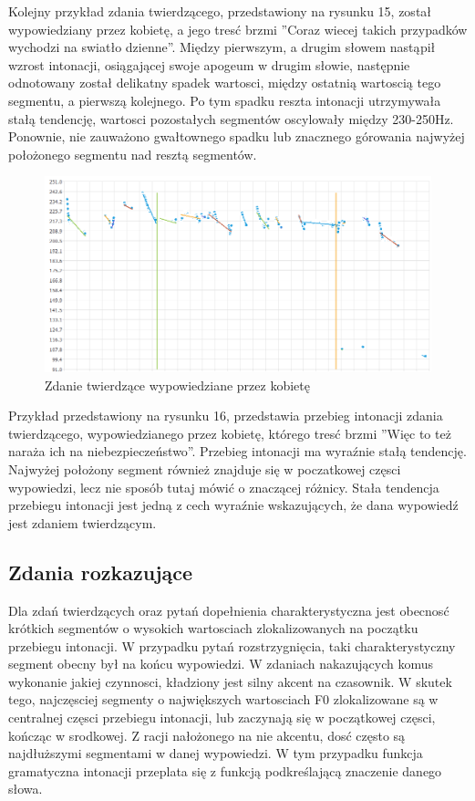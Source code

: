 \documentclass[a4paper,12 pt]{article}
\begin{document}
\FloatBarrier
Kolejny przykład zdania twierdzącego, przedstawiony na rysunku 15, został wypowiedziany przez kobietę, a jego tresć brzmi ''Coraz wiecej takich przypadków wychodzi na swiatło dzienne''. Między pierwszym, a drugim słowem nastąpił wzrost intonacji, osiągającej swoje apogeum w drugim słowie, następnie odnotowany został delikatny spadek wartosci, między ostatnią wartoscią tego segmentu, a pierwszą kolejnego. Po tym spadku reszta intonacji utrzymywała stałą tendencję, wartosci pozostałych segmentów oscylowały między 230-250Hz. Ponownie, nie zauważono gwałtownego spadku lub znacznego górowania najwyżej położonego segmentu nad resztą segmentów.
 \FloatBarrier
\begin{figure}[h]
\centering
\includegraphics[scale=0.7]{twierdzace_narazac.png}
\caption{Zdanie twierdzące wypowiedziane przez kobietę}
\end{figure}
\FloatBarrier
Przykład przedstawiony na rysunku 16, przedstawia przebieg intonacji zdania twierdzącego, wypowiedzianego przez kobietę, którego tresć brzmi ''Więc to też naraża ich na niebezpieczeństwo''. Przebieg intonacji ma wyraźnie stałą tendencję. Najwyżej położony segment również znajduje się w poczatkowej częsci wypowiedzi, lecz nie sposób tutaj mówić o znaczącej różnicy. Stała tendencja przebiegu intonacji jest jedną z cech wyraźnie wskazujących, że dana wypowiedź jest zdaniem twierdzącym.
\subsection{Zdania rozkazujące}
Dla zdań twierdzących oraz pytań dopełnienia charakterystyczna jest obecnosć krótkich segmentów o wysokich wartosciach zlokalizowanych na początku przebiegu intonacji. W przypadku pytań rozstrzygnięcia, taki charakterystyczny segment obecny był na końcu wypowiedzi. W zdaniach nakazujących komus wykonanie jakiej czynnosci, kładziony jest silny akcent na czasownik. W skutek tego, najczęsciej segmenty o największych wartosciach F0 zlokalizowane są w centralnej częsci przebiegu intonacji, lub zaczynają się w początkowej częsci, kończąc w srodkowej. Z racji nałożonego na nie akcentu, dosć często są najdłuższymi segmentami w danej wypowiedzi. W tym przypadku funkcja gramatyczna intonacji przeplata się z funkcją podkreślającą znaczenie danego słowa.
\end{document}

